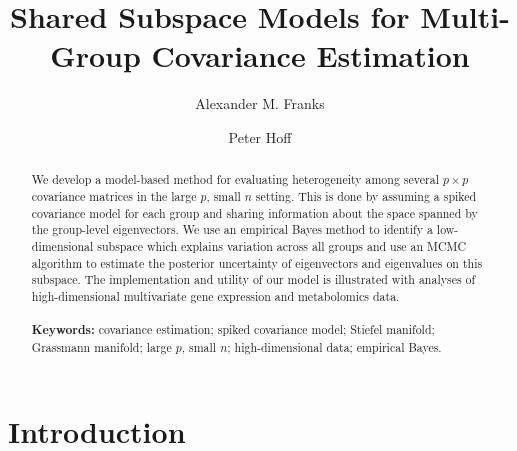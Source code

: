 \documentclass{statsoc}
\title{Shared Subspace Models for Multi-Group Covariance Estimation}
\author{Alexander M. Franks}
\author[Franks and Hoff]{Peter Hoff}
\begin{document}
\begin{abstract}

  We develop a model-based method for evaluating heterogeneity among
  several $p\times p$ covariance matrices in the large $p$, small $n$ setting.
  This is done by assuming a spiked covariance model for each group
  and sharing information about the space spanned by the group-level
  eigenvectors.  We use an empirical Bayes method to identify a low-dimensional
  subspace which explains variation across all groups and use an MCMC
  algorithm to estimate the posterior uncertainty of eigenvectors and
  eigenvalues on this subspace.  The implementation and utility of our
  model is illustrated with analyses of high-dimensional multivariate
  gene expression and metabolomics data.
\\
\\
\noindent\textbf{Keywords:} covariance estimation; spiked covariance
model; Stiefel manifold; Grassmann manifold; large $p$, small $n$;
high-dimensional data; empirical Bayes.
\vfill
\end{abstract}

\section{Introduction}



\end{document}
